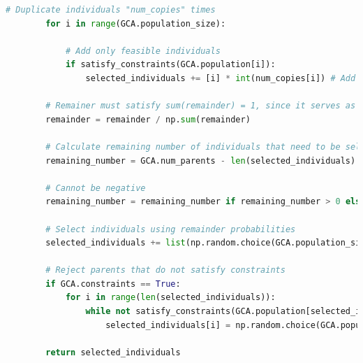\documentclass[10pt]{article}
\begin{document}
\begin{lstlisting}[language=Python, caption=selection\_functions.py, label=selection_functionspy]
        # Duplicate individuals "num_copies" times
        for i in range(GCA.population_size):
    
            # Add only feasible individuals
            if satisfy_constraints(GCA.population[i]):
                selected_individuals += [i] * int(num_copies[i]) # Add i to list num_copies[i] times
    
        # Remainer must satisfy sum(remainder) = 1, since it serves as the probabilities for further selection
        remainder = remainder / np.sum(remainder)
    
        # Calculate remaining number of individuals that need to be selected
        remaining_number = GCA.num_parents - len(selected_individuals)
        
        # Cannot be negative
        remaining_number = remaining_number if remaining_number > 0 else 0
    
        # Select individuals using remainder probabilities
        selected_individuals += list(np.random.choice(GCA.population_size, size=remaining_number, p=remainder))
    
        # Reject parents that do not satisfy constraints
        if GCA.constraints == True:
            for i in range(len(selected_individuals)):
                while not satisfy_constraints(GCA.population[selected_individuals[i]]):
                    selected_individuals[i] = np.random.choice(GCA.population_size, p=remainder)
        
        return selected_individuals    
\end{lstlisting}
\end{document}

